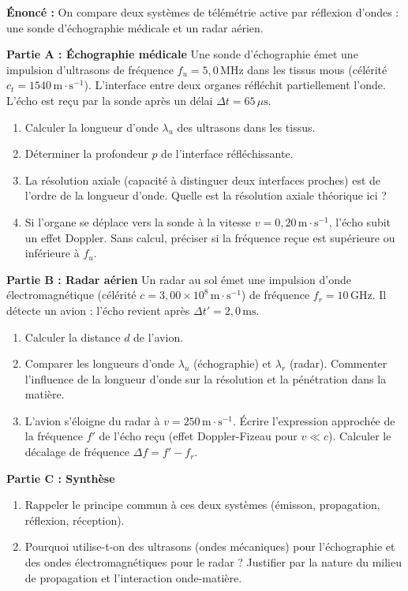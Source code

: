\documentclass[11pt]{article}
\begin{document}
\begin{exercice}
\textbf{Énoncé :} On compare deux systèmes de télémétrie active par réflexion d'ondes : une sonde d'échographie médicale et un radar aérien.

\textbf{Partie A : Échographie médicale}
Une sonde d'échographie émet une impulsion d'ultrasons de fréquence $f_u = 5,0\,\text{MHz}$ dans les tissus mous (célérité $c_t = 1540\,\text{m}\cdot\text{s}^{-1}$). L'interface entre deux organes réfléchit partiellement l'onde. L'écho est reçu par la sonde après un délai $\Delta t = 65\,\mu\text{s}$.
\begin{enumerate}
    \item Calculer la longueur d'onde $\lambda_u$ des ultrasons dans les tissus.
    \item Déterminer la profondeur $p$ de l'interface réfléchissante.
    \item La résolution axiale (capacité à distinguer deux interfaces proches) est de l'ordre de la longueur d'onde. Quelle est la résolution axiale théorique ici ?
    \item Si l'organe se déplace vers la sonde à la vitesse $v = 0,20\,\text{m}\cdot\text{s}^{-1}$, l'écho subit un effet Doppler. Sans calcul, préciser si la fréquence reçue est supérieure ou inférieure à $f_u$.
\end{enumerate}

\textbf{Partie B : Radar aérien}
Un radar au sol émet une impulsion d'onde électromagnétique (célérité $c = 3,00 \times 10^8\,\text{m}\cdot\text{s}^{-1}$) de fréquence $f_r = 10\,\text{GHz}$. Il détecte un avion : l'écho revient après $\Delta t' = 2,0\,\text{ms}$.
\begin{enumerate}
    \item Calculer la distance $d$ de l'avion.
    \item Comparer les longueurs d'onde $\lambda_u$ (échographie) et $\lambda_r$ (radar). Commenter l'influence de la longueur d'onde sur la résolution et la pénétration dans la matière.
    \item L'avion s'éloigne du radar à $v = 250\,\text{m}\cdot\text{s}^{-1}$. Écrire l'expression approchée de la fréquence $f'$ de l'écho reçu (effet Doppler-Fizeau pour $v \ll c$). Calculer le décalage de fréquence $\Delta f = f' - f_r$.
\end{enumerate}

\textbf{Partie C : Synthèse}
\begin{enumerate}
    \item Rappeler le principe commun à ces deux systèmes (émisson, propagation, réflexion, réception).
    \item Pourquoi utilise-t-on des ultrasons (ondes mécaniques) pour l'échographie et des ondes électromagnétiques pour le radar ? Justifier par la nature du milieu de propagation et l'interaction onde-matière.
\end{enumerate}
\end{exercice}
\end{document}
